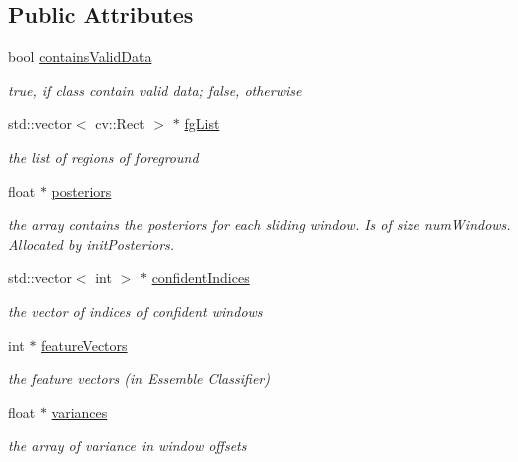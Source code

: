 \subsection*{Public Attributes}
\begin{DoxyCompactItemize}
\item 
bool \hyperlink{classtld_1_1DetectionResult_af5202404b0b269bd5f8c6b483356c517}{contains\-Valid\-Data}
\begin{DoxyCompactList}\small\item\em true, if class contain valid data; false, otherwise \end{DoxyCompactList}\item 
std\-::vector$<$ cv\-::\-Rect $>$ $\ast$ \hyperlink{classtld_1_1DetectionResult_ac640285c436ff5166d0ea34116d4dc69}{fg\-List}
\begin{DoxyCompactList}\small\item\em the list of regions of foreground \end{DoxyCompactList}\item 
float $\ast$ \hyperlink{classtld_1_1DetectionResult_abe6b7a8cc4478cce6351207939e96333}{posteriors}
\begin{DoxyCompactList}\small\item\em the array contains the posteriors for each sliding window. Is of size num\-Windows. Allocated by init\-Posteriors. \end{DoxyCompactList}\item 
std\-::vector$<$ int $>$ $\ast$ \hyperlink{classtld_1_1DetectionResult_aae986474ad532795e262e240a3ddb951}{confident\-Indices}
\begin{DoxyCompactList}\small\item\em the vector of indices of confident windows \end{DoxyCompactList}\item 
int $\ast$ \hyperlink{classtld_1_1DetectionResult_a2650bfbdb106c7dd9b774cfccf5fdb25}{feature\-Vectors}
\begin{DoxyCompactList}\small\item\em the feature vectors (in Essemble Classifier) \end{DoxyCompactList}\item 
float $\ast$ \hyperlink{classtld_1_1DetectionResult_ae0725362fbe07964e4ac6861fa1d32fb}{variances}
\begin{DoxyCompactList}\small\item\em the array of variance in window offsets \end{DoxyCompactList}\item 

\end{DoxyCompactItemize}
